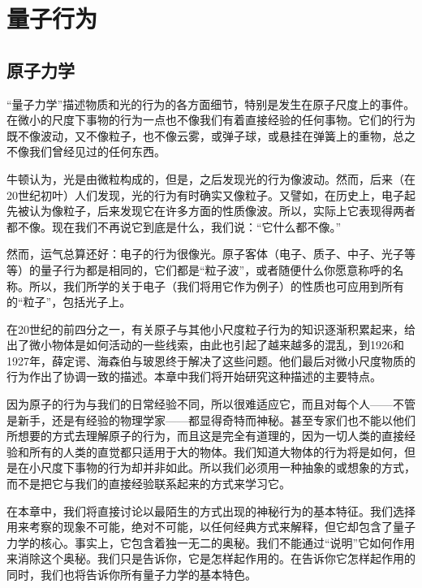 \chapter{量子行为}

\section{原子力学}

“量子力学”描述物质和光的行为的各方面细节，特别是发生在原子尺度上的事件。在微小的尺度下事物的行为一点也不像我们有着直接经验的任何事物。它们的行为既不像波动，又不像粒子，也不像云雾，或弹子球，或悬挂在弹簧上的重物，总之不像我们曾经见过的任何东西。

牛顿认为，光是由微粒构成的，但是，之后发现光的行为像波动。然而，后来（在20世纪初叶）人们发现，光的行为有时确实又像粒子。又譬如，在历史上，电子起先被认为像粒子，后来发现它在许多方面的性质像波。所以，实际上它表现得两者都不像。现在我们不再说它到底是什么，我们说：“它什么都不像。”

然而，运气总算还好：电子的行为很像光。原子客体（电子、质子、中子、光子等等）的量子行为都是相同的，它们都是“粒子波”，或者随便什么你愿意称呼的名称。所以，我们所学的关于电子（我们将用它作为例子）的性质也可应用到所有的“粒子”，包括光子上。

在20世纪的前四分之一，有关原子与其他小尺度粒子行为的知识逐渐积累起来，给出了微小物体是如何活动的一些线索，由此也引起了越来越多的混乱，到1926和1927年，薛定谔、海森伯与玻恩终于解决了这些问题。他们最后对微小尺度物质的行为作出了协调一致的描述。本章中我们将开始研究这种描述的主要特点。

因为原子的行为与我们的日常经验不同，所以很难适应它，而且对每个人——不管是新手，还是有经验的物理学家——都显得奇特而神秘。甚至专家们也不能以他们所想要的方式去理解原子的行为，而且这是完全有道理的，因为一切人类的直接经验和所有的人类的直觉都只适用于大的物体。我们知道大物体的行为将是如何，但是在小尺度下事物的行为却并非如此。所以我们必须用一种抽象的或想象的方式，而不是把它与我们的直接经验联系起来的方式来学习它。

在本章中，我们将直接讨论以最陌生的方式出现的神秘行为的基本特征。我们选择用来考察的现象不可能，绝对不可能，以任何经典方式来解释，但它却包含了量子力学的核心。事实上，它包含着独一无二的奥秘。我们不能通过“说明”它如何作用来消除这个奥秘。我们只是告诉你，它是怎样起作用的。在告诉你它怎样起作用的同时，我们也将告诉你所有量子力学的基本特色。